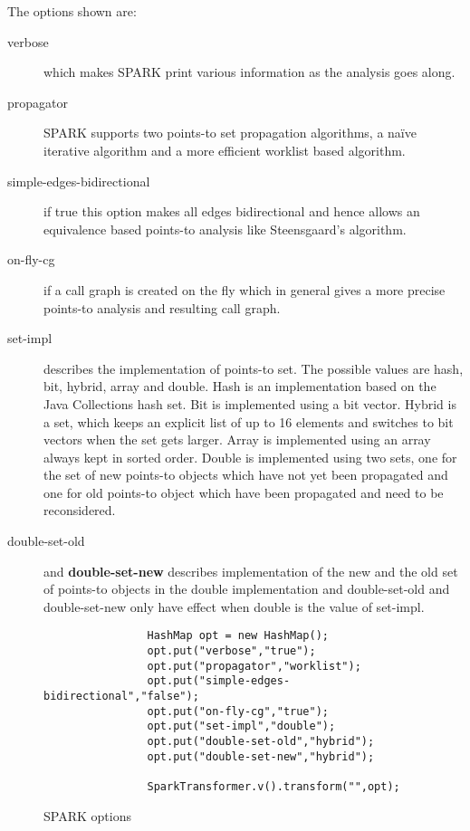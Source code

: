 \documentclass{article}
\begin{document}
The options shown are: 
\begin{description}
\item[verbose] which makes SPARK print various information as the
analysis goes along.
\item[propagator] SPARK supports two points-to set propagation
algorithms, a na\"ive iterative algorithm and a more efficient worklist
based algorithm.
\item[simple-edges-bidirectional] if true this option makes all edges
bidirectional and hence allows an equivalence based points-to analysis
like Steensgaard's algorithm.
\item[on-fly-cg] if a call graph is created on the fly which in
general gives a more precise points-to analysis and resulting call
graph.
\item[set-impl] describes the implementation of points-to set. The
possible values are hash, bit, hybrid, array and double. Hash is an
implementation based on the Java Collections hash set. Bit is
implemented using a bit vector. Hybrid is a set, which keeps an
explicit list of up to 16 elements and switches to bit vectors when
the set gets larger. Array is implemented using an array always kept
in sorted order. Double is implemented using two sets, one for the set
of new points-to objects which have not yet been propagated and one
for old points-to object which have been propagated and need to be
reconsidered.
\item[double-set-old] and \textbf{double-set-new} describes
implementation of the new and the old set of points-to objects in the
double implementation and double-set-old and double-set-new only have
effect when double is the value of set-impl.
\end{description}


\begin{figure}[!htb]
  \centering
  \begin{verbatim}
                HashMap opt = new HashMap();
                opt.put("verbose","true");
                opt.put("propagator","worklist");
                opt.put("simple-edges-bidirectional","false");
                opt.put("on-fly-cg","true");
                opt.put("set-impl","double");
                opt.put("double-set-old","hybrid");         
                opt.put("double-set-new","hybrid");
                
                SparkTransformer.v().transform("",opt);
  \end{verbatim}
  \caption{SPARK options}
  \label{fig:spark:opt}
\end{figure}
\end{document}
